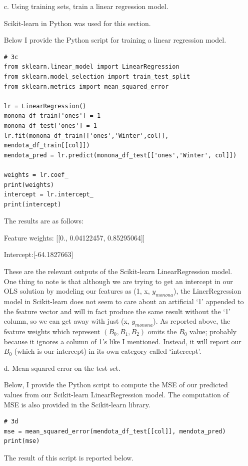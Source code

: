 \documentclass[12pt]{report}
\begin{document}
\begin{enumerate}
\item[c.] Using training sets, train a linear regression model.

  Scikit-learn in Python was used for this section.

  Below I provide the Python script for training a linear regression model.
\begin{verbatim}
# 3c
from sklearn.linear_model import LinearRegression
from sklearn.model_selection import train_test_split
from sklearn.metrics import mean_squared_error

lr = LinearRegression()
monona_df_train['ones'] = 1
monona_df_test['ones'] = 1
lr.fit(monona_df_train[['ones','Winter',col]], mendota_df_train[[col]])
mendota_pred = lr.predict(monona_df_test[['ones','Winter', col]])

weights = lr.coef_
print(weights)
intercept = lr.intercept_
print(intercept)
\end{verbatim}

The results are as follows:

Feature weights: [[0., 0.04122457, 0.85295064]]

Intercept:[-64.1827663]

These are the relevant outputs of the Scikit-learn LinearRegression model. One
thing to note is that although we are trying to get an intercept in our OLS
solution by modeling our features as (1, x, $y_{monona}$), the LinerRegression
model in Scikit-learn does not seem to care about an artificial `1' appended to
the feature vector and will in fact produce the same result without the `1'
column, so we can get away with just (x, $y_{monona}$). As reported above, the
feature weights which represent $(B_0, B_1,B_2)$ omits the $B_0$ value; probably
because it ignores a column of 1's like I mentioned. Instead, it will report our
$B_0$ (which is our intercept) in its own category called `intercept'.

\item[d.] Mean squared error on the test set.

  Below, I provide the Python script to compute the MSE of our predicted values
  from our Scikit-learn LinearRegression model. The computation of MSE is also
  provided in the Scikit-learn library.
\begin{verbatim}
# 3d
mse = mean_squared_error(mendota_df_test[[col]], mendota_pred)
print(mse)
\end{verbatim}

The result of this script is reported below.


\end{enumerate}
\end{document}

